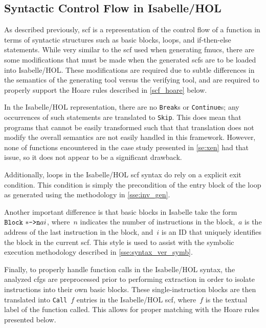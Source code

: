 \subsection{Syntactic Control Flow in Isabelle/HOL}\label{isabelle_scf}
As described previously, \acl{scf} is a representation of the control flow of a function
in terms of syntactic structures such as basic blocks,
loops, and if-then-else statements.
While very similar to the \ac{scf} used when generating \acp{fmuc},
there are some modifications that must be made when the generated \acp{scf}
are to be loaded into Isabelle/HOL.
These modifications are required due to subtle differences in the semantics
of the generating tool versus the verifying tool,
and are required to properly support the Hoare rules
described in \cref{scf_hoare} below.

In the Isabelle/HOL representation,
there are no \texttt{Break}s or \texttt{Continue}s;
any occurrences of such statements are translated to \texttt{Skip}.
This does mean that programs that cannot be easily transformed
such that that translation does not modify the overall semantics
are not easily handled in this framework.
However, none of functions encountered in the case study presented in \cref{se:xen}
had that issue, so it does not appear to be a significant drawback.

Additionally, loops in the Isabelle/HOL \ac{scf} syntax
do rely on a explicit exit condition.
This condition is simply the precondition of the entry block of the loop
as generated using the methodology in \cref{sse:inv_gen}.

Another important difference is that basic blocks in Isabelle
take the form $\texttt{Block}~\mathtt{*\texttt{->}n}{a}{i}$,
where~$n$ indicates the number of instructions in the block,~$a$ is the address
of the last instruction in the block, and~$i$ is an ID
that uniquely identifies the block in the current \ac{scf}.
This style is used to assist with the symbolic execution methodology described in
\cref{sse:syntax_ver_symb}.

Finally, to properly handle function calls in the Isabelle/HOL syntax,
the analyzed \acp{cfg} are preprocessed prior to performing extraction
in order to isolate  instructions into their own basic blocks.
These single-instruction blocks are then translated into \texttt{Call}~$f$ entries
in the Isabelle/HOL \ac{scf}, where~$f$ is the textual label of the function called.
This allows for proper matching with the Hoare rules presented below.

